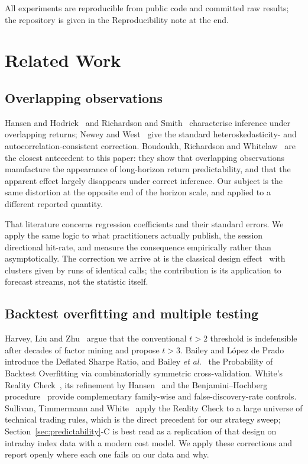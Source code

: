 \documentclass[conference]{IEEEtran}
\begin{document}
All experiments are reproducible from public code and committed raw results;
the repository is given in the Reproducibility note at the end.

\section{Related Work}

\subsection{Overlapping observations}
Hansen and Hodrick~\cite{hansen1980} and Richardson and
Smith~\cite{richardson1991} characterise inference under overlapping returns;
Newey and West~\cite{newey1987} give the standard heteroskedasticity- and
autocorrelation-consistent correction. Boudoukh, Richardson and
Whitelaw~\cite{boudoukh2008} are the closest antecedent to this paper: they show
that overlapping observations manufacture the appearance of long-horizon return
predictability, and that the apparent effect largely disappears under correct
inference. Our subject is the same distortion at the opposite end of the
horizon scale, and applied to a different reported quantity.

That literature concerns regression coefficients and their standard errors. We
apply the same logic to what practitioners actually publish, the session
directional hit-rate, and measure the consequence empirically rather than
asymptotically. The correction we arrive at is the classical design
effect~\cite{kish1965,moulton1990} with clusters given by runs of identical
calls; the contribution is its application to forecast streams, not the
statistic itself.

\subsection{Backtest overfitting and multiple testing}
Harvey, Liu and Zhu~\cite{harvey2016} argue that the conventional $t > 2$
threshold is indefensible after decades of factor mining and propose $t > 3$.
Bailey and L\'opez de Prado~\cite{bailey2014} introduce the Deflated Sharpe
Ratio, and Bailey \emph{et al.}~\cite{bailey2017} the Probability of Backtest
Overfitting via combinatorially symmetric cross-validation. White's Reality
Check~\cite{white2000}, its refinement by Hansen~\cite{hansen2005} and the
Benjamini--Hochberg procedure~\cite{bh1995} provide complementary family-wise
and false-discovery-rate controls. Sullivan, Timmermann and
White~\cite{sullivan1999} apply the Reality Check to a large universe of
technical trading rules, which is the direct precedent for our strategy sweep;
Section~\ref{sec:predictability}-C is best read as a replication of that design
on intraday index data with a modern cost model. We apply these corrections and
report openly where each one fails on our data and why.
\end{document}
